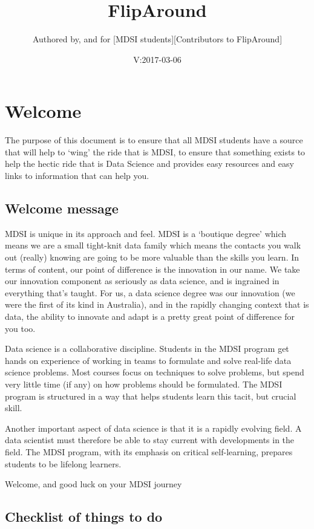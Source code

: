 \documentclass[]{book}
\title{FlipAround}
\author{Authored by, and for {[}MDSI students{]}{[}Contributors to FlipAround{]}}
\date{V:2017-03-06}
\theoremstyle{definition}
\theoremstyle{definition}
\theoremstyle{remark}
\begin{document}
\maketitle

{
\setcounter{tocdepth}{1}
\tableofcontents
}
\chapter{Welcome}\label{welcome}

The purpose of this document is to ensure that all MDSI students have a
source that will help to `wing' the ride that is MDSI, to ensure that
something exists to help the hectic ride that is Data Science and
provides easy resources and easy links to information that can help you.

\section{Welcome message}\label{welcome-message}

MDSI is unique in its approach and feel. MDSI is a `boutique degree'
which means we are a small tight-knit data family which means the
contacts you walk out (really) knowing are going to be more valuable
than the skills you learn. In terms of content, our point of difference
is the innovation in our name. We take our innovation component as
seriously as data science, and is ingrained in everything that's taught.
For us, a data science degree was our innovation (we were the first of
its kind in Australia), and in the rapidly changing context that is
data, the ability to innovate and adapt is a pretty great point of
difference for you too.

Data science is a collaborative discipline. Students in the MDSI program
get hands on experience of working in teams to formulate and solve
real-life data science problems. Most courses focus on techniques to
solve problems, but spend very little time (if any) on how problems
should be formulated. The MDSI program is structured in a way that helps
students learn this tacit, but crucial skill.

Another important aspect of data science is that it is a rapidly
evolving field. A data scientist must therefore be able to stay current
with developments in the field. The MDSI program, with its emphasis on
critical self-learning, prepares students to be lifelong learners.

Welcome, and good luck on your MDSI journey

\section{Checklist of things to do}\label{checklist-of-things-to-do}
\end{document}

